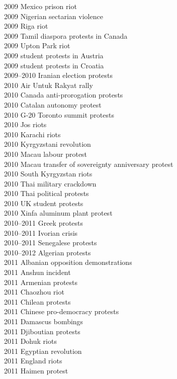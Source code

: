 2009 Mexico prison riot\\
2009 Nigerian sectarian violence\\
2009 Riga riot\\
2009 Tamil diaspora protests in Canada\\
2009 Upton Park riot\\
2009 student protests in Austria\\
2009 student protests in Croatia\\
2009–2010 Iranian election protests\\
2010 Air Untuk Rakyat rally\\
2010 Canada anti-prorogation protests\\
2010 Catalan autonomy protest\\
2010 G-20 Toronto summit protests\\
2010 Jos riots\\
2010 Karachi riots\\
2010 Kyrgyzstani revolution\\
2010 Macau labour protest\\
2010 Macau transfer of sovereignty anniversary protest\\
2010 South Kyrgyzstan riots\\
2010 Thai military crackdown\\
2010 Thai political protests\\
2010 UK student protests\\
2010 Xinfa aluminum plant protest\\
2010–2011 Greek protests\\
2010–2011 Ivorian crisis\\
2010–2011 Senegalese protests\\
2010–2012 Algerian protests\\
2011 Albanian opposition demonstrations\\
2011 Anshun incident\\
2011 Armenian protests\\
2011 Chaozhou riot\\
2011 Chilean protests\\
2011 Chinese pro-democracy protests\\
2011 Damascus bombings\\
2011 Djiboutian protests\\
2011 Dohuk riots\\
2011 Egyptian revolution\\
2011 England riots\\
2011 Haimen protest\\
